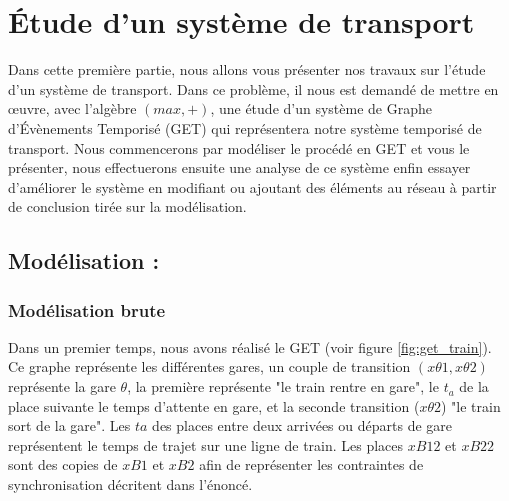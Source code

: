 \chapter{Étude d'un système de transport}
Dans cette première partie, nous allons vous présenter nos travaux sur l'étude d'un système de transport. Dans ce problème, il nous est demandé de mettre en œuvre, avec l'algèbre $(max,+)$, une étude d'un système de Graphe d'Évènements Temporisé (GET) qui représentera notre système temporisé de transport. Nous commencerons par modéliser le procédé en GET et vous le présenter, nous effectuerons ensuite une analyse de ce système enfin essayer d'améliorer le système en modifiant ou ajoutant des éléments au réseau à partir de conclusion tirée sur la modélisation.

\section{Modélisation :}
\subsection{Modélisation brute}
Dans un premier temps, nous avons réalisé le GET (voir figure \ref{fig:get_train}). Ce graphe représente les différentes gares, un couple de transition $(x \theta1,x\theta2)$ représente la gare $\theta$, la première représente "le train rentre en gare", le $t_a$ de la place suivante le temps d'attente en gare, et la seconde transition ($x\theta2$) "le train sort de la gare". Les $ta$ des places entre deux arrivées ou départs de gare représentent le temps de trajet sur une ligne de train. Les places $xB12$ et $xB22$ sont des copies  de $xB1$ et $xB2$ afin de représenter les contraintes de synchronisation décritent dans l'énoncé.

